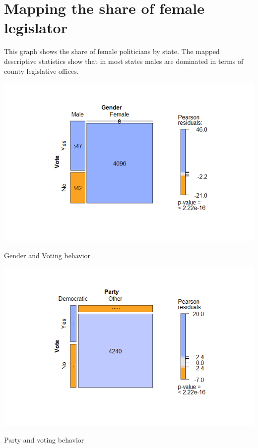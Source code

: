 \documentclass{article}
\begin{document}
\section{Mapping the share of female legislator}

This graph shows the share of female politicians by state. The mapped descriptive statistics show that in most states males are dominated in terms of county legislative offices.   




 

 
\includegraphics[width=\textwidth]{PS6a_Tayebi.png}
\begin{center}

Gender and Voting behavior
\end{center}


\includegraphics[width=\textwidth]{PS6b_Tayebi.png}
\begin{center}

Party and voting behavior
\end{center}
\end{document}
